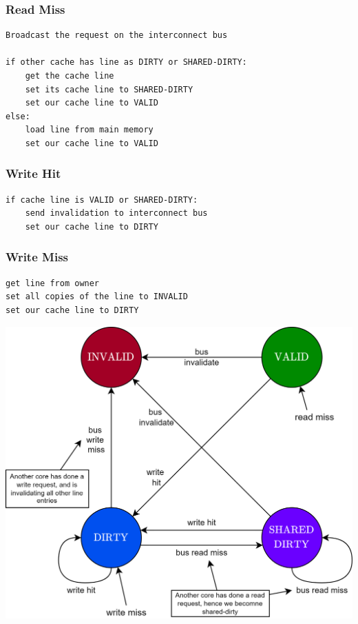 \subsubsection{Read Miss}
\begin{minipage}{.5\textwidth}
	\begin{verbatim}
Broadcast the request on the interconnect bus

if other cache has line as DIRTY or SHARED-DIRTY:
    get the cache line
    set its cache line to SHARED-DIRTY
    set our cache line to VALID
else:
    load line from main memory
    set our cache line to VALID
    \end{verbatim}
\end{minipage}
\begin{minipage}{.5\textwidth}
	\subsubsection{Write Hit}
	\begin{verbatim}
if cache line is VALID or SHARED-DIRTY:
    send invalidation to interconnect bus
    set our cache line to DIRTY
    \end{verbatim}

	\subsubsection{Write Miss}
	\begin{verbatim}
get line from owner
set all copies of the line to INVALID
set our cache line to DIRTY
    \end{verbatim}
\end{minipage}
\begin{center}
	\includegraphics[width=.7\textwidth]{parallel_programming/images/berkley_transitions.drawio.png}
\end{center}
